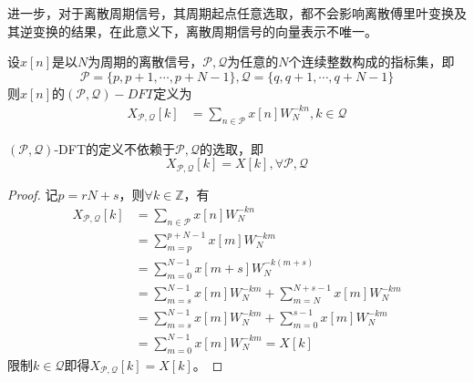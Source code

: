 \documentclass{ctexbook}
\begin{document}
进一步，对于离散周期信号，其周期起点任意选取，都不会影响离散傅里叶变换及其逆变换的结果，在此意义下，离散周期信号的向量表示不唯一。
\begin{definition}
    设$x[n]$是以$N$为周期的离散信号，$\mathcal{P} ,\mathcal{Q} $为任意的$N$个连续整数构成的指标集，即
    \[\mathcal{P} =\{p,p+1,\cdots,p+N-1\},\mathcal{Q} =\{q,q+1,\cdots,q+N-1\}\]
    则$x[n]$的$(\mathcal{P} ,\mathcal{Q} )-DFT$定义为
    \begin{align*}
    X_{\mathcal{P} ,\mathcal{Q} }[k]&=\sum_{n\in\mathcal{P} }x[n]W_N^{-kn},k\in\mathcal{Q}
    \end{align*}
\end{definition}
\begin{proposition}
    $(\mathcal{P} ,\mathcal{Q} )$-DFT的定义不依赖于$\mathcal{P} ,\mathcal{Q} $的选取，即
    \[X_{\mathcal{P} ,\mathcal{Q} }[k]=X[k],\forall \mathcal{P} ,\mathcal{Q} \]
\end{proposition}
\begin{proof}
    记$p=rN+s$，则$\forall k\in\mathbb{Z}$，有\begin{align*}
    X_{\mathcal{P} ,\mathcal{Q} }[k]&=\sum_{n\in\mathcal{P} }x[n]W_N^{-kn}\\
    &=\sum_{m=p}^{p+N-1}x[m]W_N^{-km}\\
    &=\sum_{m=0}^{N-1}x[m+s]W_N^{-k(m+s)}\\
    &=\sum_{m=s}^{N-1}x[m]W_N^{-km}+\sum_{m=N}^{N+s-1}x[m]W_N^{-km}\\
    &=\sum_{m=s}^{N-1}x[m]W_N^{-km}+\sum_{m=0}^{s-1}x[m]W_N^{-km}\\
    &=\sum_{m=0}^{N-1}x[m]W_N^{-km}=X[k]
    \end{align*}
    限制$k\in\mathcal{Q} $即得$X_{\mathcal{P} ,\mathcal{Q} }[k]=X[k]$。
\end{proof}
\end{document}
